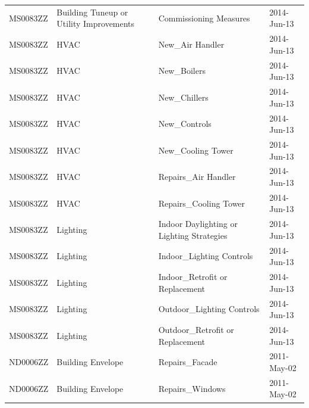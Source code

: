 \documentclass[12pt]{article}
\begin{document}
\begin{longtable}{lp{4cm}p{4cm}p{3cm}}
MS0083ZZ         & Building Tuneup or Utility Improvements & Commissioning Measures                    & 2014-Jun-13                   \\
MS0083ZZ         & HVAC                                    & New\_Air Handler                          & 2014-Jun-13                   \\
MS0083ZZ         & HVAC                                    & New\_Boilers                              & 2014-Jun-13                   \\
MS0083ZZ         & HVAC                                    & New\_Chillers                             & 2014-Jun-13                   \\
MS0083ZZ         & HVAC                                    & New\_Controls                             & 2014-Jun-13                   \\
MS0083ZZ         & HVAC                                    & New\_Cooling Tower                        & 2014-Jun-13                   \\
MS0083ZZ         & HVAC                                    & Repairs\_Air Handler                      & 2014-Jun-13                   \\
MS0083ZZ         & HVAC                                    & Repairs\_Cooling Tower                    & 2014-Jun-13                   \\
MS0083ZZ         & Lighting                                & Indoor Daylighting or Lighting Strategies & 2014-Jun-13                   \\
MS0083ZZ         & Lighting                                & Indoor\_Lighting Controls                 & 2014-Jun-13                   \\
MS0083ZZ         & Lighting                                & Indoor\_Retrofit or Replacement           & 2014-Jun-13                   \\
MS0083ZZ         & Lighting                                & Outdoor\_Lighting Controls                & 2014-Jun-13                   \\
MS0083ZZ         & Lighting                                & Outdoor\_Retrofit or Replacement          & 2014-Jun-13                   \\
ND0006ZZ         & Building Envelope                       & Repairs\_Facade                           & 2011-May-02                   \\
ND0006ZZ         & Building Envelope                       & Repairs\_Windows                          & 2011-May-02                   \\

\end{longtable}
\end{document}
